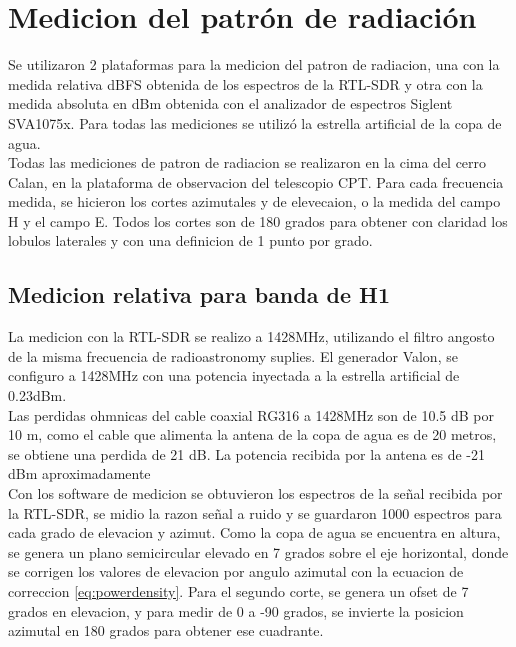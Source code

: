 \section{Medicion del patrón de radiación}

Se utilizaron 2 plataformas para la medicion del patron de radiacion, una con la medida relativa dBFS obtenida de los espectros de la RTL-SDR y otra con la medida absoluta en dBm obtenida con el analizador de espectros Siglent SVA1075x. Para todas las mediciones se utilizó la estrella artificial de la copa de agua.\\

Todas las mediciones de patron de radiacion se realizaron en la cima del cerro Calan, en la plataforma de observacion del telescopio CPT. Para cada frecuencia medida, se hicieron los cortes azimutales y de elevecaion, o la medida del campo H y el campo E. Todos los cortes son de 180 grados para obtener con claridad los lobulos laterales y con una definicion de 1 punto por grado.\\


\subsection{Medicion relativa para banda de H1}

La medicion con la RTL-SDR se realizo a 1428MHz, utilizando el filtro angosto de la misma frecuencia de radioastronomy suplies. El generador Valon, se configuro a 1428MHz con una potencia inyectada a la estrella artificial de 0.23dBm.\\

Las perdidas ohmnicas del cable coaxial RG316 a 1428MHz son de 10.5 dB por 10 m, como el cable que alimenta la antena de la copa de agua es de 20 metros, se obtiene una perdida de 21 dB. La potencia recibida por la antena es de -21 dBm aproximadamente\\

Con los software de medicion se obtuvieron los espectros de la señal recibida por la RTL-SDR, se midio la razon señal a ruido y se guardaron 1000 espectros para cada grado de elevacion y azimut. Como la copa de agua se encuentra en altura, se genera un plano semicircular elevado en 7 grados sobre el eje horizontal, donde se corrigen los valores de elevacion por angulo azimutal con la ecuacion de correccion \ref{eq:powerdensity}. Para el segundo corte, se genera un ofset de 7 grados en elevacion, y para medir de 0 a -90 grados, se invierte la posicion azimutal en 180 grados para obtener ese cuadrante.\\

